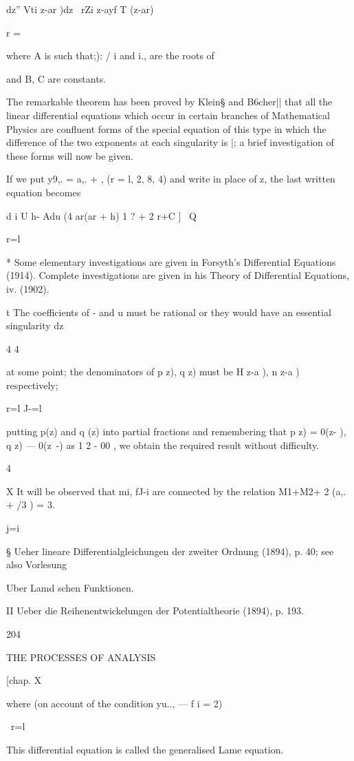 dz'' Vti z-ar )dz \ rZi z-ayf T (z-ar)

r = \

where A is such that;): / i and i., are the roots of

and B, C are constants.

The remarkable theorem has been proved by Klein§ and B6cher|| that all
the linear differential equations which occur in certain branches of
Mathematical Physics are confluent forms of the special equation of
this type in which the difference of the two exponents at each
singularity is |; a brief investigation of these forms will now be
given.

If we put y9,. = a,. + , (r = l, 2, 8, 4) and write in place of z, the
last written equation becomes

d i U h- Adu (4 ar(ar + h) 1 ? + 2 r+C ] \ Q

r=l

* Some elementary investigations are given in Forsyth's Differential
Equations (1914). Complete investigations are given in his Theory of
Differential Equations, iv. (1902).

t The coefficients of - and u must be rational or they would have an
essential singularity dz

4 4

at some point; the denominators of p z), q z) must be H z-a ), n z-a )
respectively;

r=l J-=l

putting p(z) and q (z) into partial fractions and remembering that p
z) = 0(z- ), q z) — 0(z~-) as 1 2 - 00 , we obtain the required result
without difficulty.

4

X It will be observed that mi, fJ-i are connected by the relation
M1+M2+ 2 (a,. + /3 ) = 3.

j=i

§ Ueher lineare Differentialgleichungen der zweiter Ordnung (1894), p.
40; see also Vorlesung

Uber Lamd schen Funktionen.

II Ueber die Reihenentwickelungen der Potentialtheorie (1894), p. 193.

204

THE PROCESSES OF ANALYSIS

[chap. X

where (on account of the condition yu.., — f i = 2)

\ r=l

This differential equation is called the generalised Lame equation.

